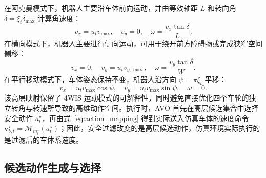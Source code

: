\documentclass[UTF8,10pt,a4paper,twocolumn]{ctexart}
\begin{document}
在阿克曼模式下，机器人主要沿车体前向运动，并由等效轴距 $L$ 和转向角 $\delta=\xi_t\delta_{\max}$ 计算角速度：
\begin{equation}
v_x=u_t v_{\max},\quad v_y=0,\quad
\omega=\frac{v_x\tan\delta}{L}.
\end{equation}
在横向模式下，机器人主要进行侧向运动，可用于绕开前方障碍物或完成狭窄空间侧移：
\begin{equation}
v_x=0,\quad v_y=u_t v_{y,\max},\quad
\omega=\frac{v_y\tan\delta}{W}.
\end{equation}
在平行移动模式下，车体姿态保持不变，机器人沿方向 $\psi=\pi\xi_t$ 平移：
\begin{equation}
v_x=u_t v_{\max}\cos\psi,\quad
v_y=u_t v_{\max}\sin\psi,\quad
\omega=0.
\end{equation}
该高层映射保留了 4WIS 运动模式的可解释性，同时避免直接优化四个车轮的独立转角与转速所导致的高维动作空间。执行时，AVO 首先在高层候选集合中选择安全动作 $a_t^{\star}$，再由式~\ref{eq:action_mapping} 得到实际送入仿真车体的速度命令 $\mathbf v_{b,t}^{\star}=\mathcal M_{m_t^{\star}}(a_t^{\star})$；因此，安全过滤改变的是高层候选动作，仿真环境实际执行的是过滤后的车体系速度。

\begin{table}[H]
    \centering

    \caption{4WIS multimodal action interpretation}
    \label{tab:motion_modes}
    \scriptsize

\end{table}

\subsection{候选动作生成与选择}
\end{document}
